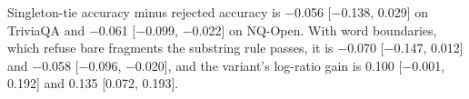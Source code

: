 Singleton-tie accuracy minus rejected accuracy is $-$0.056 [$-$0.138, 0.029] on TriviaQA and $-$0.061 [$-$0.099, $-$0.022] on NQ-Open. With word boundaries, which refuse bare fragments the substring rule passes, it is $-$0.070 [$-$0.147, 0.012] and $-$0.058 [$-$0.096, $-$0.020], and the variant's log-ratio gain is 0.100 [$-$0.001, 0.192] and 0.135 [0.072, 0.193].